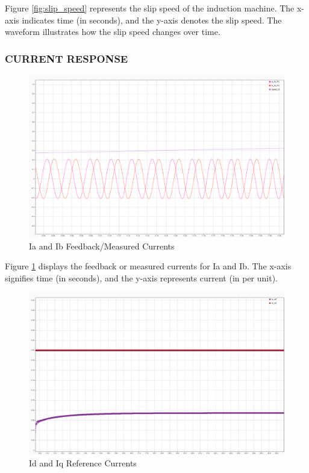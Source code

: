 Figure \ref{fig:slip_speed} represents the slip speed of the induction machine. The x-axis indicates time (in seconds), and the y-axis denotes the slip speed. The waveform illustrates how the slip speed changes over time. 


\subsubsection{CURRENT RESPONSE}


\begin{figure}[H]
	\centering
	\includegraphics[width=6in]{sections/section3/images/simulationResutls/Ia_Ib_fb.png}
	\caption{Ia and Ib Feedback/Measured Currents}
	\label{fig:current_response_IA_IB}
\end{figure}

Figure \ref{fig:current_response_IA_IB} displays the feedback or measured currents for Ia and Ib. The x-axis signifies time (in seconds), and the y-axis represents current (in per unit).


\begin{figure}[H]
	\centering
	\includegraphics[width=6in]{sections/section3/images/simulationResutls/Id_ref_Iq_ref.png}
	\caption{Id and Iq Reference Currents}
	\label{fig:current_response_Id_ref_Iq_ref}
\end{figure}

